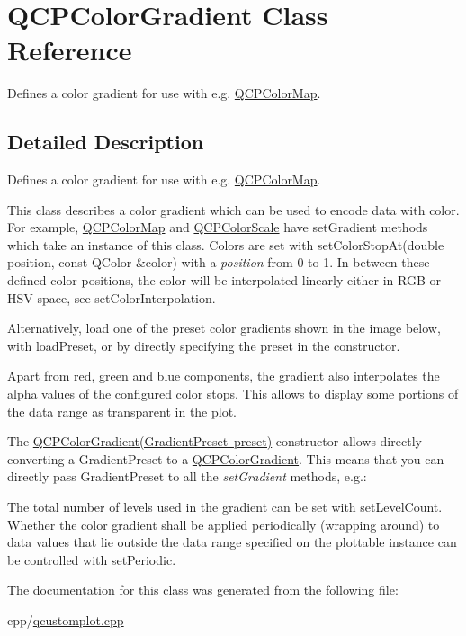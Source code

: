 \hypertarget{class_q_c_p_color_gradient}{}\section{Q\+C\+P\+Color\+Gradient Class Reference}
\label{class_q_c_p_color_gradient}


Defines a color gradient for use with e.\+g. \mbox{\hyperlink{class_q_c_p_color_map}{Q\+C\+P\+Color\+Map}}.  




\subsection{Detailed Description}
Defines a color gradient for use with e.\+g. \mbox{\hyperlink{class_q_c_p_color_map}{Q\+C\+P\+Color\+Map}}. 

This class describes a color gradient which can be used to encode data with color. For example, \mbox{\hyperlink{class_q_c_p_color_map}{Q\+C\+P\+Color\+Map}} and \mbox{\hyperlink{class_q_c_p_color_scale}{Q\+C\+P\+Color\+Scale}} have set\+Gradient methods which take an instance of this class. Colors are set with set\+Color\+Stop\+At(double position, const Q\+Color \&color) with a {\itshape position} from 0 to 1. In between these defined color positions, the color will be interpolated linearly either in R\+GB or H\+SV space, see set\+Color\+Interpolation.

Alternatively, load one of the preset color gradients shown in the image below, with load\+Preset, or by directly specifying the preset in the constructor.

Apart from red, green and blue components, the gradient also interpolates the alpha values of the configured color stops. This allows to display some portions of the data range as transparent in the plot.



The \mbox{\hyperlink{class_q_c_p_color_gradient}{Q\+C\+P\+Color\+Gradient(\+Gradient\+Preset preset)}} constructor allows directly converting a Gradient\+Preset to a \mbox{\hyperlink{class_q_c_p_color_gradient}{Q\+C\+P\+Color\+Gradient}}. This means that you can directly pass Gradient\+Preset to all the {\itshape set\+Gradient} methods, e.\+g.\+: 
\begin{DoxyCodeInclude}
\end{DoxyCodeInclude}
 The total number of levels used in the gradient can be set with set\+Level\+Count. Whether the color gradient shall be applied periodically (wrapping around) to data values that lie outside the data range specified on the plottable instance can be controlled with set\+Periodic. 

The documentation for this class was generated from the following file\+:\begin{DoxyCompactItemize}
\item 
cpp/\mbox{\hyperlink{qcustomplot_8cpp}{qcustomplot.\+cpp}}\end{DoxyCompactItemize}
